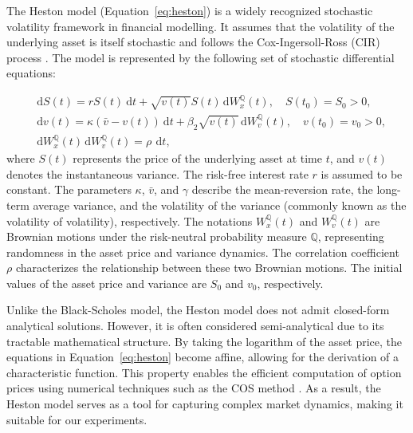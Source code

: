 \documentclass{article}
\begin{document}
{The Heston model (Equation~\eqref{eq:heston}) is a widely recognized stochastic volatility framework in financial modelling. It assumes that the volatility of the underlying asset is itself stochastic and follows the Cox-Ingersoll-Ross (CIR) process \cite{doi:10.1142/9789812701022_0005}. The model is represented by the following set of stochastic differential equations:

\begin{subequations}\label{eq:heston}
\begin{align}
&\mathrm{d} S(t) = r S(t) \mathrm{~d} t + \sqrt{v(t)} S(t) \, \mathrm{d} W_x^{\mathbb{Q}}(t), \quad S\left(t_0\right) = S_0 > 0, \\ 
&\mathrm{d} v(t) = \kappa(\bar{v} - v(t)) \mathrm{~d} t + \beta_2 \sqrt{v(t)} \, \mathrm{d} W_v^{\mathbb{Q}}(t), \quad v\left(t_0\right) = v_0 > 0, \\ 
&\mathrm{d} W_x^{\mathbb{Q}}(t) \, \mathrm{d} W_v^{\mathbb{Q}}(t) = \rho \, \mathrm{~d} t,
\end{align}
\end{subequations}
where \( S(t) \) represents the price of the underlying asset at time \( t \), and \( v(t) \) denotes the instantaneous variance. The risk-free interest rate \( r \) is assumed to be constant. The parameters \( \kappa \), \( \bar{v} \), and \( \gamma \) describe the mean-reversion rate, the long-term average variance, and the volatility of the variance (commonly known as the volatility of volatility), respectively. The notations \( W_x^{\mathbb{Q}}(t) \) and \( W_v^{\mathbb{Q}}(t) \) are Brownian motions under the risk-neutral probability measure \( \mathbb{Q} \), representing randomness in the asset price and variance dynamics. The correlation coefficient \( \rho \) characterizes the relationship between these two Brownian motions. The initial values of the asset price and variance are \( S_0 \) and \( v_0 \), respectively.

Unlike the Black-Scholes model, the Heston model does not admit closed-form analytical solutions. However, it is often considered semi-analytical due to its tractable mathematical structure. By taking the logarithm of the asset price, the equations in Equation~\eqref{eq:heston} become affine, allowing for the derivation of a characteristic function. This property enables the efficient computation of option prices using numerical techniques such as the COS method \cite{doi:10.1137/080718061}. As a result, the Heston model serves as a tool for capturing complex market dynamics, making it suitable for our experiments.

}
\end{document}
